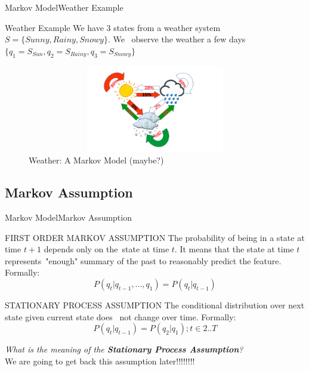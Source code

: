 \documentclass[10pt]{beamer}
\begin{document}
\begin{frame}{Markov Model}{Weather Example}
  \begin{block}{Weather Example}
     We have 3 states from a weather system $S = \{Sunny, Rainy, Snowy\}$. We \
     observe the weather a few days \
     $\{q_1 = S_{Sun}, q_2 = S_{Rainy}, q_3 = S_{Snowy}\}$
  \end{block}
  \begin{figure}[h]
    \centering
    \includegraphics[width=4.5in,height=1.5in]{figures/weather_example.png}
    \caption {Weather: A Markov Model (maybe?)}
  \end{figure}
\end{frame}

\subsection{Markov Assumption}
\begin{frame}{Markov Model}{Markov Assumption}
  \begin{block}{FIRST ORDER MARKOV ASSUMPTION}
        The probability of being in a state at time $t+1$ depends only on the\
        state at time $t$. It means that the state at time $t$ represents\
        "enough" summary of the past to reasonably predict the feature\cite{Daniel}. 
        Formally:\\
        \begin{equation}
            P(q_t|q_{t-1},...,q_1) = P(q_t|q_{t-1})
        \end{equation}
  \end{block}
  \begin{block}{STATIONARY PROCESS ASSUMPTION}
       The conditional distribution over next state given current state does \
       not change over time\cite{Daniel}. Formally:\\
        \begin{equation}
             P(q_t|q_{t-1}) = P(q_2|q_1);t \in 2..T
        \end{equation}
  \end{block}
  \textit{What is the meaning of the \textbf{Stationary Process Assumption}?}\\
  We are going to get back this assumption later!!!!!!!!
\end{frame}
\end{document}
